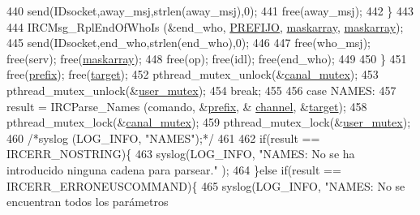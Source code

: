 \begin{DoxyCode}
{{{{{{440                                         send(IDsocket,away\_msj,strlen(away\_msj),0);
441                                         free(away\_msj);
442                                 \}
443 
444                                 IRCMsg\_RplEndOfWhoIs (&end\_who, \hyperlink{_g-2361-06-_p1-_server_8h_a78c658ff923693099f7b621e7c351129}{PREFIJO}, 
      \hyperlink{_g-2361-06-_p1-_server_8c_ad51a4303b7c769561b12bf04a68bc042}{maskarray}, \hyperlink{_g-2361-06-_p1-_server_8c_ad51a4303b7c769561b12bf04a68bc042}{maskarray});
445                                 send(IDsocket,end\_who,strlen(end\_who),0);
446 
447                                 free(who\_msj); free(serv); free(\hyperlink{_g-2361-06-_p1-_server_8c_ad51a4303b7c769561b12bf04a68bc042}{maskarray});
448                                 free(op); free(idl); free(end\_who);
449                                 
450                         \}
451                         free(\hyperlink{_g-2361-06-_p1-_server_8c_ad2849cf781a4db22cc1b31eaaee50a4f}{prefix}); free(\hyperlink{_g-2361-06-_p1-_server_8c_a23b26cdb3a71f525caf03b57f68d47fa}{target}); 
452                         pthread\_mutex\_unlock(&\hyperlink{_g-2361-06-_p1-_server_8c_ab86a544a49de18195048bac54dd3ac3e}{canal\_mutex});
453                         pthread\_mutex\_unlock(&\hyperlink{_g-2361-06-_p1-_server_8c_a5dedd07a1144d2ab70b74a8e64b6a7c0}{user\_mutex});
454                         \textcolor{keywordflow}{break};
455 
456                 \textcolor{keywordflow}{case} NAMES:
457                         result = IRCParse\_Names (comando, &\hyperlink{_g-2361-06-_p1-_server_8c_ad2849cf781a4db22cc1b31eaaee50a4f}{prefix}, &
      \hyperlink{_g-2361-06-_p1-_server_8c_a842ca2f026578e5c479c095ff3335969}{channel}, &\hyperlink{_g-2361-06-_p1-_server_8c_a23b26cdb3a71f525caf03b57f68d47fa}{target});
458                 pthread\_mutex\_lock(&\hyperlink{_g-2361-06-_p1-_server_8c_ab86a544a49de18195048bac54dd3ac3e}{canal\_mutex});
459                         pthread\_mutex\_lock(&\hyperlink{_g-2361-06-_p1-_server_8c_a5dedd07a1144d2ab70b74a8e64b6a7c0}{user\_mutex});
460                \textcolor{comment}{/*syslog (LOG\_INFO, "NAMES");*/}
461 
462                 \textcolor{keywordflow}{if}(result == IRCERR\_NOSTRING)\{
463                                 syslog(LOG\_INFO, \textcolor{stringliteral}{"NAMES: No se ha introducido ninguna cadena para parsear."}
      );
464                         \}\textcolor{keywordflow}{else} \textcolor{keywordflow}{if}(result == IRCERR\_ERRONEUSCOMMAND)\{
465                                 syslog(LOG\_INFO, \textcolor{stringliteral}{"NAMES: No se encuentran todos los parámetros
}}}}}}}
\end{DoxyCode}
